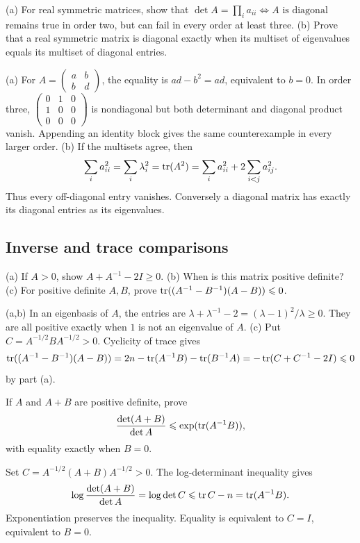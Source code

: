 \begin{problem}\label{ex:12:ineq-ma-27}
(a) For real symmetric matrices, show that
\(\det A=\prod_i a_{ii}\iff A\text{ is diagonal}\) remains true in
order two, but can fail in every order at least three.
(b) Prove that a real symmetric matrix is diagonal exactly when its
multiset of eigenvalues equals its multiset of diagonal entries.
\end{problem}
\begin{solution}
(a) For \(A=\begin{pmatrix}a&b\\b&d\end{pmatrix}\), the equality is
\(ad-b^2=ad\), equivalent to \(b=0\).
In order three, \(\begin{pmatrix}0&1&0\\1&0&0\\0&0&0\end{pmatrix}\)
is nondiagonal but both determinant and diagonal product vanish.
Appending an identity block gives the same counterexample in every larger order.
(b) If the multisets agree, then
\[
\sum_i a_{ii}^2=\sum_i\lambda_i^2=\operatorname{tr}(A^2)
=\sum_i a_{ii}^2+2\sum_{i<j}a_{ij}^2.
\]
Thus every off-diagonal entry vanishes. Conversely a diagonal matrix
has exactly its diagonal entries as its eigenvalues.
\end{solution}

\subsection*{Inverse and trace comparisons}

\begin{problem}\label{ex:12:ineq-ma-28}
(a) If \(A>0\), show \(A+A^{-1}-2I\geqslant0\).
(b) When is this matrix positive definite?
(c) For positive definite \(A,B\), prove
\(\operatorname{tr}((A^{-1}-B^{-1})(A-B))\leqslant0\).
\end{problem}
\begin{solution}
(a,b) In an eigenbasis of \(A\), the entries are
\(\lambda+\lambda^{-1}-2=(\lambda-1)^2/\lambda\geqslant0\).
They are all positive exactly when \(1\) is not an eigenvalue of \(A\).
(c) Put \(C=A^{-1/2}BA^{-1/2}>0\). Cyclicity of trace gives
\[
\operatorname{tr}((A^{-1}-B^{-1})(A-B))
=2n-\operatorname{tr}(A^{-1}B)-\operatorname{tr}(B^{-1}A)
=-\operatorname{tr}(C+C^{-1}-2I)\leqslant0
\]
by part (a).
\end{solution}

\begin{problem}\label{ex:12:ineq-ma-30}
If \(A\) and \(A+B\) are positive definite, prove
\[
\frac{\det(A+B)}{\det A}\leqslant\exp(\operatorname{tr}(A^{-1}B)),
\]
with equality exactly when \(B=0\).
\end{problem}
\begin{solution}
Set \(C=A^{-1/2}(A+B)A^{-1/2}>0\).
The log-determinant inequality gives
\[
\log\frac{\det(A+B)}{\det A}=\log\det C
\leqslant\operatorname{tr} C-n=\operatorname{tr}(A^{-1}B).
\]
Exponentiation preserves the inequality. Equality is equivalent to
\(C=I\), equivalent to \(B=0\).
\end{solution}

